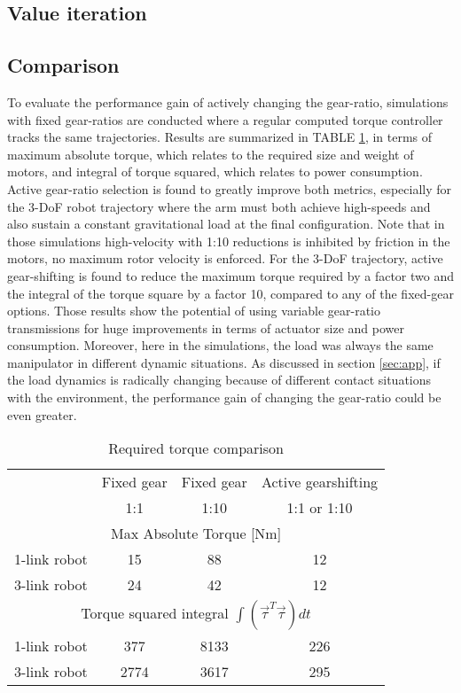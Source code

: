 \subsection{Value iteration}




\subsection{Comparison}


To evaluate the performance gain of actively changing the gear-ratio, simulations with fixed gear-ratios are conducted where a regular computed torque controller tracks the same trajectories. Results are summarized in TABLE \ref{tab:MaximumTorqueComparison}, in terms of maximum absolute torque, which relates to the required size and weight of motors, and integral of torque squared, which relates to power consumption. Active gear-ratio selection is found to greatly improve both metrics, especially for the 3-DoF robot trajectory where the arm must both achieve high-speeds and also sustain a constant gravitational load at the final configuration. Note that in those simulations high-velocity with 1:10 reductions is inhibited by friction in the motors, no maximum rotor velocity is enforced. For the 3-DoF trajectory, active gear-shifting is found to reduce the maximum torque required by a factor two and the integral of the torque square by a factor 10, compared to any of the fixed-gear options. Those results show the potential of using variable gear-ratio transmissions for huge improvements in terms of actuator size and power consumption. Moreover, here in the simulations, the load was always the same manipulator in different dynamic situations. As discussed in section \ref{sec:app}, if the load dynamics is radically changing because of different contact situations with the environment, the performance gain of changing the gear-ratio could be even greater. 
%
\begin{table}[htp]
	\centering
		\begin{tabular}{ c c c c }
		\hline
		     & Fixed gear & Fixed gear & Active gearshifting \\
			& 1:1 &  1:10 &  1:1 or 1:10 \\
		\hline \hline
		\multicolumn{4}{c}{ Max Absolute Torque [Nm] } \\
		\hline \hline
		1-link robot  & 15 & 88 & 12 \\	
		3-link robot  & 24 & 42 & 12 \\	
		\hline \hline
		\multicolumn{4}{c}{ Torque squared integral $\int{ ( \vec{\tau}^T \vec{\tau} ) dt }$ } \\
		\hline \hline
		1-link robot  & 377  & 8133 & 226  \\	
		3-link robot  & 2774 & 3617 & 295  \\	
		\hline \hline
		\end{tabular}
	\caption{Required torque comparison}
	\label{tab:MaximumTorqueComparison}
	\vspace{-20pt}
\end{table}
%



